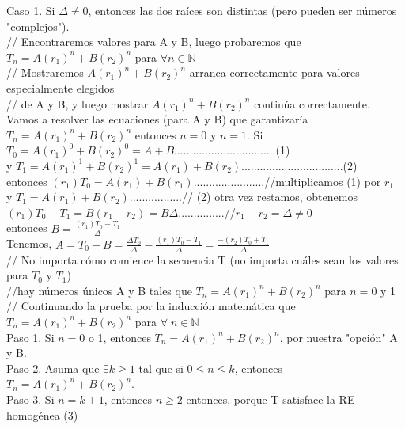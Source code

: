 \documentclass{article}
\begin{document}
Caso 1. Si $\Delta \neq 0$, entonces las dos raíces son distintas (pero pueden ser números "complejos").\\

// Encontraremos valores para A y B, luego probaremos que $T_n = A(r_1)^n + B(r_2)^n$ para $\forall n \in \mathbb{N}$\\
// Mostraremos $A(r_1)^n + B(r_2)^n$ arranca correctamente para valores especialmente elegidos\\
// de A y B, y luego mostrar $A(r_1)^n + B(r_2)^n$ continúa correctamente.\\

Vamos a resolver las ecuaciones (para A y B) que garantizaría $T_n = A(r_1)^n + B(r_2)^n$ entonces $n=0$ y $n=1$. Si\\

$T_0 = A(r_1)^0 + B(r_2)^0 = A + B$.................................(1)\\
 y $T_1 = A(r_1)^1 + B(r_2)^1 = A(r_1) + B(r_2)$.................................(2)\\
 
entonces $(r_1)T_0 = A(r_1) + B(r_1)$.......................//multiplicamos (1) por $r_1$\\
y $T_1 = A(r_1) + B(r_2)$.................// (2) otra vez restamos, obtenemos\\

$(r_1)T_0 - T_1 = B(r_1 - r_2) = B\Delta$...............//$r_1 - r_2 = \Delta \neq 0$\\

entonces $B = \frac{(r_1)T_0 - T_1}{\Delta}$\\

Tenemos, $A=T_0 - B =\frac{\Delta T_0}{\Delta} -\frac{(r_1)T_0 - T_1}{\Delta} = \frac{-(r_2)T_0+T_1}{\Delta}$\\
// No importa cómo comience la secuencia T (no importa cuáles sean los valores para $T_0$ y $T_1$)\\
//hay números únicos A y B tales que $T_n = A(r_1)^n + B(r_2)^n$ para $n = 0$ y 1\\
// Continuando la prueba por la inducción matemática que $T_n= A(r_1)^n + B(r_2)^n$ para $\forall \; n \in \mathbb{N}$\\

Paso 1. Si $n=0$ o 1, entonces $T_n = A(r_1)^n + B(r_2)^n$, por nuestra "opción" A y B.\\
Paso 2. Asuma que $\exists k \geq 1$ tal que si $0\leq n \leq k$, entonces $T_n = A(r_1)^n + B(r_2)^n$.\\
Paso 3. Si $n= k+1$, entonces $n \geq 2$ entonces, porque T satisface la RE homogénea (3)\\
\end{document}
